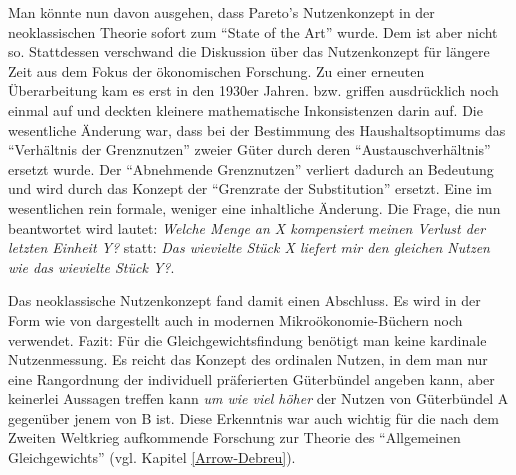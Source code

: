 Man könnte nun davon ausgehen, dass Pareto's Nutzenkonzept in der neoklassischen Theorie sofort zum "`State of the Art"' wurde. Dem ist aber nicht so. Stattdessen verschwand die Diskussion über das Nutzenkonzept für längere Zeit \parencite[S. 148]{Blaug2001} aus dem Fokus der ökonomischen Forschung. Zu einer erneuten Überarbeitung kam es erst in den 1930er Jahren. \textcite{Hicks1934b} bzw. \textcite{Hicks1934a} griffen ausdrücklich \textcite{Pareto1906} noch einmal auf und deckten kleinere mathematische Inkonsistenzen darin auf. Die wesentliche Änderung war, dass bei der Bestimmung des Haushaltsoptimums das "`Verhältnis der Grenznutzen"' zweier Güter durch deren "`Austauschverhältnis"' ersetzt wurde. Der "`Abnehmende Grenznutzen"' verliert dadurch an Bedeutung und wird durch das Konzept der "`Grenzrate der Substitution"' ersetzt. Eine im wesentlichen rein formale, weniger eine inhaltliche Änderung. Die Frage, die nun beantwortet wird lautet: \textit{Welche Menge an X kompensiert meinen Verlust der letzten Einheit Y?} statt: \textit{Das wievielte Stück X liefert mir den gleichen Nutzen wie das wievielte Stück Y?}.

Das neoklassische Nutzenkonzept fand damit einen Abschluss. Es wird in der Form wie von \textcite{Hicks1934b} dargestellt auch in modernen Mikroökonomie-Büchern noch verwendet. Fazit: Für die Gleichgewichtsfindung benötigt man keine kardinale Nutzenmessung. Es reicht das Konzept des ordinalen Nutzen, in dem man nur eine Rangordnung der individuell präferierten Güterbündel angeben kann, aber keinerlei Aussagen treffen kann \textit{um wie viel höher} der Nutzen von Güterbündel A gegenüber jenem von B ist. Diese Erkenntnis war auch wichtig für die nach dem Zweiten Weltkrieg aufkommende Forschung zur Theorie des "`Allgemeinen Gleichgewichts"' (vgl. Kapitel \ref{Arrow-Debreu}). 

